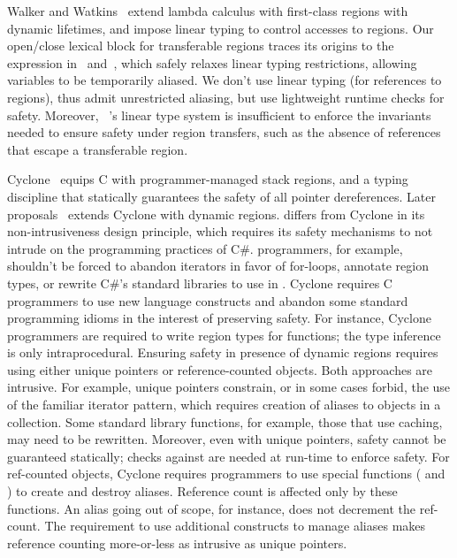 Walker and Watkins~\cite{WW01} extend lambda calculus with first-class regions
with dynamic lifetimes, and impose linear typing to control accesses to regions.
Our open/close lexical block for transferable regions traces its origins to the 
expression in~\cite{WW01} and~\cite{wadler90}, which safely relaxes
linear typing restrictions, allowing variables to be temporarily
aliased.
We don't use linear typing (for references to regions), thus admit unrestricted aliasing,
but use lightweight runtime checks for safety.
Moreover, ~\cite{WW01}'s linear type system is insufficient to enforce
the invariants needed to ensure safety under region transfers, such as
the absence of references that escape a transferable region.

Cyclone~\cite{cyclone02} equips C with programmer-managed stack
regions, and a typing discipline that statically guarantees the safety
of all pointer dereferences. Later
proposals~\cite{cyclone04,cycloneSCP} extends Cyclone with dynamic
regions. \name differs from Cyclone in its non-intrusiveness design principle,
which requires its safety
mechanisms to not intrude on the programming practices of C\#.
\name programmers, for example, shouldn't be forced to abandon
iterators in favor of for-loops, annotate region types, or rewrite
C\#'s standard libraries to use in \name. Cyclone requires C
programmers to use new language constructs and abandon some standard
programming idioms in the interest of preserving safety. For instance,
Cyclone programmers are required to write region types for functions;
the type inference is only intraprocedural. Ensuring safety in
presence of dynamic regions requires using either unique pointers or
reference-counted objects.  Both approaches are intrusive. For
example, unique pointers constrain, or in some cases forbid, the use
of the familiar iterator pattern, which requires creation of aliases
to objects in a collection. Some standard library functions, for
example, those that use caching, may need to be rewritten.  Moreover,
even with unique pointers, safety cannot be guaranteed statically;
checks against  are needed at run-time to enforce safety. For
ref-counted objects, Cyclone requires programmers to use special
functions ( and ) to create and
destroy aliases.  Reference count is affected only by these functions.
An alias going out of scope, for instance, does not decrement the
ref-count. The requirement to use additional constructs
to manage aliases makes reference counting more-or-less as intrusive
as unique pointers.

